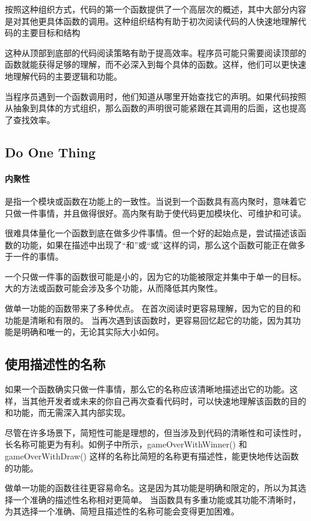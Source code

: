 按照这种组织方式，代码的第一个函数提供了一个高层次的概述，其中大部分内容是对其他更具体函数的调用。这种组织结构有助于初次阅读代码的人快速地理解代码的主要目标和结构

这种从顶部到底部的代码阅读策略有助于提高效率。程序员可能只需要阅读顶部的函数就能获得足够的理解，而不必深入到每个具体的函数。这样，他们可以更快速地理解代码的主要逻辑和功能。

当程序员遇到一个函数调用时，他们知道从哪里开始查找它的声明。如果代码按照从抽象到具体的方式组织，那么函数的声明很可能紧跟在其调用的后面，这也提高了查找效率。

\subsection{Do One Thing}
\paragraph{内聚性}是指一个模块或函数在功能上的一致性。当说到一个函数具有高内聚时，意味着它只做一件事情，并且做得很好。高内聚有助于使代码更加模块化、可维护和可读。

很难具体量化一个函数到底在做多少件事情。但一个好的起始点是，尝试描述该函数的功能，如果在描述中出现了“和”或“或”这样的词，那么这个函数可能正在做多于一件的事情。

一个只做一件事的函数很可能是小的，因为它的功能被限定并集中于单一的目标。
大的方法或函数可能会涉及多个功能，从而降低其内聚性。

做单一功能的函数带来了多种优点。
在首次阅读时更容易理解，因为它的目的和功能是清晰和有限的。
当再次遇到该函数时，更容易回忆起它的功能，因为其功能是明确和唯一的，无论其实际大小如何。

\subsection{使用描述性的名称}
如果一个函数确实只做一件事情，那么它的名称应该清晰地描述出它的功能。这样，当其他开发者或未来的你自己再次查看代码时，可以快速地理解该函数的目的和功能，而无需深入其内部实现。

尽管在许多场景下，简短性可能是理想的，但当涉及到代码的清晰性和可读性时，长名称可能更为有利。如例子中所示，gameOverWithWinner() 和 gameOverWithDraw() 这样的名称比简短的名称更有描述性，能更快地传达函数的功能。

做单一功能的函数往往更容易命名。这是因为其功能是明确和限定的，所以为其选择一个准确的描述性名称相对更简单。
当函数具有多重功能或其功能不清晰时，为其选择一个准确、简短且描述性的名称可能会变得更加困难。




